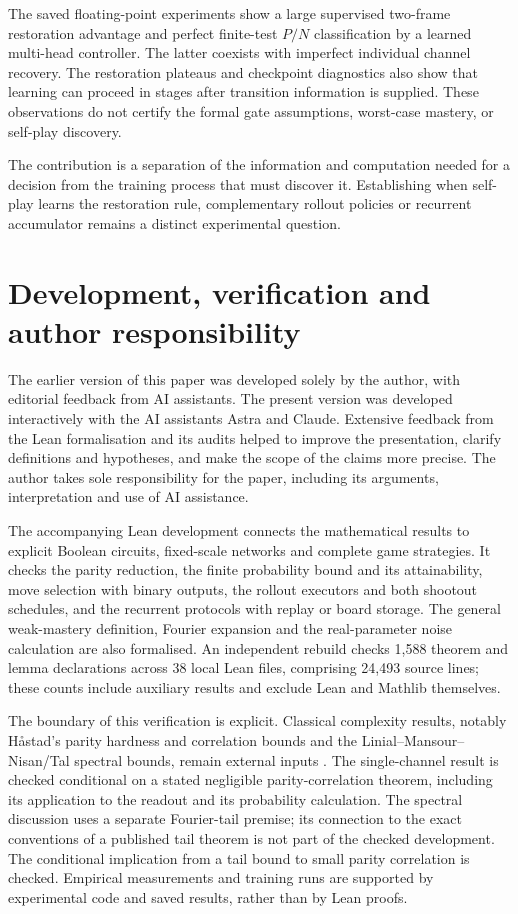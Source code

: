 \documentclass[twoside,11pt]{article}
\numberwithin{theorem}{section}
\numberwithin{equation}{section}
\begin{document}
The saved floating-point experiments show a large supervised two-frame restoration advantage and perfect finite-test $P/N$ classification by a learned multi-head controller. The latter coexists with imperfect individual channel recovery. The restoration plateaus and checkpoint diagnostics also show that learning can proceed in stages after transition information is supplied. These observations do not certify the formal gate assumptions, worst-case mastery, or self-play discovery.

The contribution is a separation of the information and computation needed for a decision from the training process that must discover it. Establishing when self-play learns the restoration rule, complementary rollout policies or recurrent accumulator remains a distinct experimental question.

\section{Development, verification and author responsibility}
\label{sec:development}
\label{sec:verification}
The earlier version of this paper was developed solely by the author, with editorial feedback from AI assistants. The present version was developed interactively with the AI assistants Astra and Claude. Extensive feedback from the Lean formalisation and its audits helped to improve the presentation, clarify definitions and hypotheses, and make the scope of the claims more precise. The author takes sole responsibility for the paper, including its arguments, interpretation and use of AI assistance.

The accompanying Lean development \citep{riis2026lean} connects the mathematical results to explicit Boolean circuits, fixed-scale networks and complete game strategies. It checks the parity reduction, the finite probability bound and its attainability, move selection with binary outputs, the rollout executors and both shootout schedules, and the recurrent protocols with replay or board storage. The general weak-mastery definition, Fourier expansion and the real-parameter noise calculation are also formalised. An independent rebuild checks 1,588 theorem and lemma declarations across 38 local Lean files, comprising 24,493 source lines; these counts include auxiliary results and exclude Lean and Mathlib themselves.

The boundary of this verification is explicit. Classical complexity results, notably H{\aa}stad's parity hardness and correlation bounds and the Linial--Mansour--Nisan/Tal spectral bounds, remain external inputs \citep{hastad1986thesis,hastad2014correlation,linial1993constant,tal2015tight}. The single-channel result is checked conditional on a stated negligible parity-correlation theorem, including its application to the readout and its probability calculation. The spectral discussion uses a separate Fourier-tail premise; its connection to the exact conventions of a published tail theorem is not part of the checked development. The conditional implication from a tail bound to small parity correlation is checked. Empirical measurements and training runs are supported by experimental code and saved results, rather than by Lean proofs.
\end{document}
